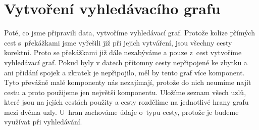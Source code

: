 \section{Vytvoření vyhledávacího grafu}
Poté, co jsme připravili data, vytvoříme vyhledávací graf. Protože kolize
přímých cest s~překážkami jsme vyřešili již při jejich vytváření, jsou všechny
cesty korektní. Proto se překážkami již dále nezabýváme a pouze z~cest vytvoříme
vyhledávací graf. Pokud byly v datech přítomny cesty nepřipojené ke zbytku a ani 
přidání spojek a zkratek je nepřipojilo, měl by tento graf více komponent. Tyto
převážně malé komponenty nás nezajímají, protože do nich neumíme najít cestu a
proto použijeme jen největší komponentu. Uložíme seznam všech uzlů, které jsou
na jejích cestách použity a cesty rozdělíme na jednotlivé hrany grafu mezi dvěma
uzly.  U~hran zachováme údaje o~typu cesty, protože je budeme využívat při
vyhledávání.
